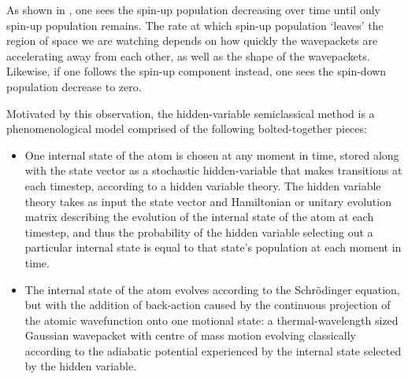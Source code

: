 As shown in , one sees the spin-up population decreasing over time until only spin-up population remains. The rate at which spin-up population `leaves' the region of space we are watching depends on how quickly the wavepackets are accelerating away from each other, as well as the shape of the wavepackets. Likewise, if one follows the spin-up component instead, one sees the spin-down population decrease to zero.

Motivated by this observation, the hidden-variable semiclassical method is a phenomenological model comprised of the following bolted-together pieces:
\begin{itemize}
\item{One internal state of the atom is chosen at any moment in time, stored along with the state vector as a stochastic hidden-variable that makes transitions at each timestep, according to a hidden variable theory. The hidden variable theory takes as input the state vector and Hamiltonian or unitary evolution matrix describing the evolution of the internal state of the atom at each timestep, and thus the probability of the hidden variable selecting out a particular internal state is equal to that state's population at each moment in time.}
\item{The internal state of the atom evolves according to the Schr\"odinger equation, but with the addition of back-action caused by the continuous projection of the atomic wavefunction onto one motional state: a thermal-wavelength sized Gaussian wavepacket with centre of mass motion evolving classically according to the adiabatic potential experienced by the internal state selected by the hidden variable.}
\end{itemize}


